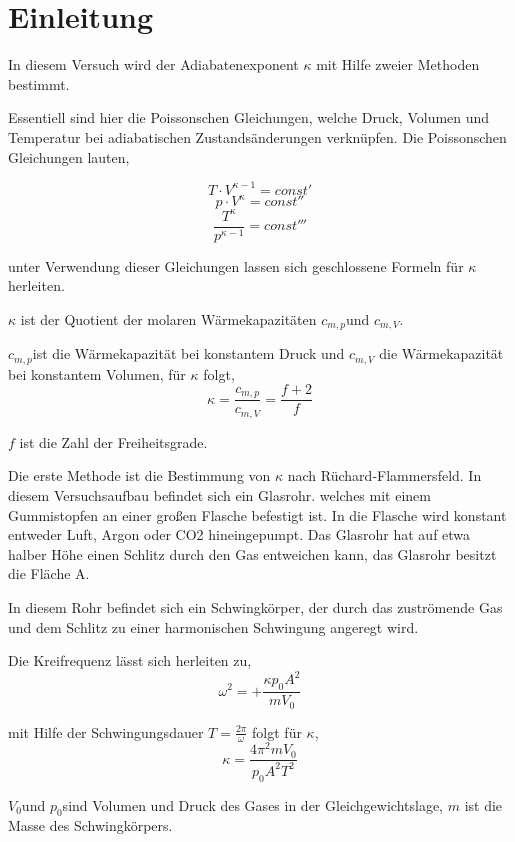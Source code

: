 \section{Einleitung}
In diesem Versuch wird der Adiabatenexponent $\kappa$ mit Hilfe zweier
Methoden bestimmt.

Essentiell sind hier die Poissonschen Gleichungen, welche Druck, Volumen
und Temperatur bei adiabatischen Zustandsänderungen verknüpfen. Die
Poissonschen Gleichungen lauten,

\[
T\cdot V^{\kappa-1}=const'
\]
\begin{equation}
p\cdot V^{\kappa}=const''\label{eq:Poisson}
\end{equation}
\[
\frac{T^{\kappa}}{p^{\kappa-1}}=const'''
\]


unter Verwendung dieser Gleichungen lassen sich geschlossene Formeln
für $\kappa$ herleiten.

$\kappa$ ist der Quotient der molaren Wärmekapazitäten $c_{m,p}$und
$c_{m,V}$.

$c_{m,p}$ist die Wärmekapazität bei konstantem Druck und $c_{m,V}$
die Wärmekapazität bei konstantem Volumen, für $\kappa$ folgt,
\[
\kappa=\frac{c_{m,p}}{c_{m,V}}=\frac{f+2}{f}
\]


$f$ ist die Zahl der Freiheitsgrade.

Die erste Methode ist die Bestimmung von $\kappa$ nach Rüchard-Flammersfeld.
In diesem Versuchsaufbau befindet sich ein Glasrohr. welches mit einem
Gummistopfen an einer großen Flasche befestigt ist. In die Flasche
wird konstant entweder Luft, Argon oder CO2 hineingepumpt. Das Glasrohr
hat auf etwa halber Höhe einen Schlitz durch den Gas entweichen kann,
das Glasrohr besitzt die Fläche A.

In diesem Rohr befindet sich ein Schwingkörper, der durch das zuströmende
Gas und dem Schlitz zu einer harmonischen Schwingung angeregt wird.

Die Kreifrequenz lässt sich herleiten zu,
\begin{equation}
\omega^{2}=+\frac{\kappa p_{0}A^{2}}{mV_{0}}\label{eq:Frequenz}
\end{equation}


mit Hilfe der Schwingungsdauer $T=\frac{2\pi}{\omega}$ folgt für
$\kappa$,
\begin{equation}
\kappa=\frac{4\pi^{2}mV_{0}}{p_{0}A^{2}T^{2}}\label{eq:adiabatenexponent}
\end{equation}


$V_{0}$und $p_{0}$sind Volumen und Druck des Gases in der Gleichgewichtslage,
$m$ ist die Masse des Schwingkörpers.

